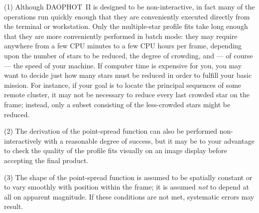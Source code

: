 \item{(1)} Although DAOPHOT~II is designed to be non-interactive, in
fact many of the operations run quickly enough that they are
conveniently executed directly from the terminal or workstation.  Only
the multiple-star profile fits take long enough that they are more
conveniently performed in batch mode: they may require anywhere from a
few CPU minutes to a few CPU hours per frame, depending upon the number
of stars to be reduced, the degree of crowding, and --- of course ---
the speed of your machine.  If computer time is expensive for you, you
may want to decide just how many stars must be reduced in order to
fulfill your basic mission.  For instance, if your goal is to locate
the principal sequences of some remote cluster, it may not be necessary
to reduce every last crowded star on the frame; instead, only a subset
consisting of the less-crowded stars might be reduced. 

\item{(2)} The derivation of the point-spread function can also be
performed non-interactively with a reasonable degree of success, 
but it may be to your advantage to check the quality of the profile
fits visually on an image display before accepting the final product.

\item{(3)} The shape of the point-spread function is assumed to 
be spatially constant or to vary smoothly with position within the 
frame; it is assumed {\it not\/} to depend at all on apparent 
magnitude.  If these conditions are not met, systematic errors may 
result. 

